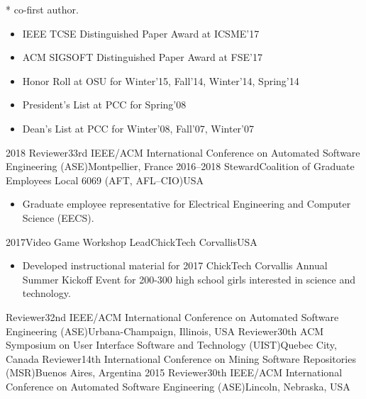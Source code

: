\documentclass[localFont,alternative]{yaac-another-awesome-cv}
\begin{document}
\smallskip
* co-first author.
\begingroup
\renewcommand{\section}[2]{}%
\nocite{*}


\endgroup

\twocolumnsection
{
\begin{skills}
\end{skills}}
{
\vspace{1em}
\begin{itemize}
	\item IEEE TCSE Distinguished Paper Award at ICSME'17
	\item ACM SIGSOFT Distinguished Paper Award at FSE'17
	\item Honor Roll at OSU for Winter'15, Fall'14, Winter'14, Spring'14
	\item President's List at PCC for Spring'08
	\item Dean's List at PCC for Winter'08, Fall'07, Winter'07
\end{itemize}
}

\begin{experiences}
  \service
    {2018}    {Reviewer}{33rd IEEE/ACM International Conference on Automated Software Engineering (ASE)}{Montpellier, France}
  \serviceLong
    {2016--2018}       {Steward}{Coalition of Graduate Employees Local 6069 (AFT, AFL--CIO)}{USA}
    {} {
                        \begin{itemize}
                          \item Graduate employee representative for Electrical Engineering and Computer Science (EECS).
                        \end{itemize}
                     }
  \serviceLong
    {2017}{Video Game Workshop Lead}{ChickTech Corvallis}{USA}
    {}    {
                      \begin{itemize}
                        \item Developed instructional material for 2017 ChickTech Corvallis Annual Summer Kickoff Event for 200-300 high school girls interested in science and technology.                          
                      \end{itemize}
                    }
  \service
    {}    {Reviewer}{32nd IEEE/ACM International Conference on Automated Software Engineering (ASE)}{Urbana-Champaign, Illinois, USA}
  \service
    {}    {Reviewer}{30th ACM Symposium on User Interface Software and Technology (UIST)}{Quebec City, Canada}
  \service
    {}    {Reviewer}{14th International Conference on Mining Software Repositories (MSR)}{Buenos Aires, Argentina}
  \service
    {2015}    {Reviewer}{30th IEEE/ACM International Conference on Automated Software Engineering (ASE)}{Lincoln, Nebraska, USA}
  \emptySeparator
\end{experiences}
\end{document}
